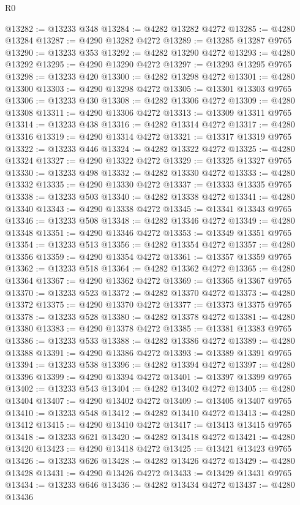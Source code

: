 \begin{lexlean}{R0}
\begin{coremodule}
@13282 := @13233 @348
@13284 := @4282 @13282 @4272
@13285 := @4280 @13284
@13287 := @4290 @13282 @4272
@13289 := @13285 @13287 @9765
@13290 := @13233 @353
@13292 := @4282 @13290 @4272
@13293 := @4280 @13292
@13295 := @4290 @13290 @4272
@13297 := @13293 @13295 @9765
@13298 := @13233 @420
@13300 := @4282 @13298 @4272
@13301 := @4280 @13300
@13303 := @4290 @13298 @4272
@13305 := @13301 @13303 @9765
@13306 := @13233 @430
@13308 := @4282 @13306 @4272
@13309 := @4280 @13308
@13311 := @4290 @13306 @4272
@13313 := @13309 @13311 @9765
@13314 := @13233 @438
@13316 := @4282 @13314 @4272
@13317 := @4280 @13316
@13319 := @4290 @13314 @4272
@13321 := @13317 @13319 @9765
@13322 := @13233 @446
@13324 := @4282 @13322 @4272
@13325 := @4280 @13324
@13327 := @4290 @13322 @4272
@13329 := @13325 @13327 @9765
@13330 := @13233 @498
@13332 := @4282 @13330 @4272
@13333 := @4280 @13332
@13335 := @4290 @13330 @4272
@13337 := @13333 @13335 @9765
@13338 := @13233 @503
@13340 := @4282 @13338 @4272
@13341 := @4280 @13340
@13343 := @4290 @13338 @4272
@13345 := @13341 @13343 @9765
@13346 := @13233 @508
@13348 := @4282 @13346 @4272
@13349 := @4280 @13348
@13351 := @4290 @13346 @4272
@13353 := @13349 @13351 @9765
@13354 := @13233 @513
@13356 := @4282 @13354 @4272
@13357 := @4280 @13356
@13359 := @4290 @13354 @4272
@13361 := @13357 @13359 @9765
@13362 := @13233 @518
@13364 := @4282 @13362 @4272
@13365 := @4280 @13364
@13367 := @4290 @13362 @4272
@13369 := @13365 @13367 @9765
@13370 := @13233 @523
@13372 := @4282 @13370 @4272
@13373 := @4280 @13372
@13375 := @4290 @13370 @4272
@13377 := @13373 @13375 @9765
@13378 := @13233 @528
@13380 := @4282 @13378 @4272
@13381 := @4280 @13380
@13383 := @4290 @13378 @4272
@13385 := @13381 @13383 @9765
@13386 := @13233 @533
@13388 := @4282 @13386 @4272
@13389 := @4280 @13388
@13391 := @4290 @13386 @4272
@13393 := @13389 @13391 @9765
@13394 := @13233 @538
@13396 := @4282 @13394 @4272
@13397 := @4280 @13396
@13399 := @4290 @13394 @4272
@13401 := @13397 @13399 @9765
@13402 := @13233 @543
@13404 := @4282 @13402 @4272
@13405 := @4280 @13404
@13407 := @4290 @13402 @4272
@13409 := @13405 @13407 @9765
@13410 := @13233 @548
@13412 := @4282 @13410 @4272
@13413 := @4280 @13412
@13415 := @4290 @13410 @4272
@13417 := @13413 @13415 @9765
@13418 := @13233 @621
@13420 := @4282 @13418 @4272
@13421 := @4280 @13420
@13423 := @4290 @13418 @4272
@13425 := @13421 @13423 @9765
@13426 := @13233 @626
@13428 := @4282 @13426 @4272
@13429 := @4280 @13428
@13431 := @4290 @13426 @4272
@13433 := @13429 @13431 @9765
@13434 := @13233 @646
@13436 := @4282 @13434 @4272
@13437 := @4280 @13436

\end{coremodule}
\end{lexlean}
